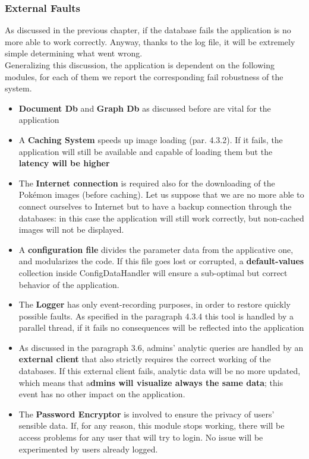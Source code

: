 \subsubsection{External Faults}
As discussed in the previous chapter, if the database fails the application is no more able to work correctly. Anyway, thanks to the log file, it will be extremely simple determining what went wrong.\\
Generalizing this discussion, the application is dependent on the following modules, for each of them we report the corresponding fail robustness of the system.
\begin{itemize}
	\item \textbf{Document Db} and \textbf{Graph Db} as discussed before are vital for the application
	\item A \textbf{Caching System} speeds up image loading (par. 4.3.2). If it fails, the application will still be available and capable of loading them but the \textbf{latency will be higher}
    \item The \textbf{Internet connection} is required also for the downloading of the Pokémon images (before caching). Let us suppose that we are no more able to connect ourselves to Internet but to have a backup connection through the databases: in this case the application will still work correctly, but non-cached images will not be displayed.
	\item A \textbf{configuration file} divides the parameter data from the applicative one, and modularizes the code. If this file goes lost or corrupted, a \textbf{default-values} collection inside ConfigDataHandler will ensure a sub-optimal but correct behavior of the application.
	\item The \textbf{Logger} has only event-recording purposes, in order to restore quickly possible faults. As specified in the paragraph 4.3.4 this tool is handled by a parallel thread, if it fails no consequences will be reflected into the application
	\item As discussed in the paragraph 3.6, admins’ analytic queries are handled by an \textbf{external client} that also strictly requires the correct working of the databases. 
	If this external client fails, analytic data will be no more updated, which means that a\textbf{dmins will visualize always the same data}; this event has no other impact on the application.  
	\item The \textbf{Password Encryptor} is involved to ensure the privacy of users’ sensible data. If, for any reason, this module stops working, there will be access problems for any user that will try to login. No issue will be experimented by users already logged.
\end{itemize}
